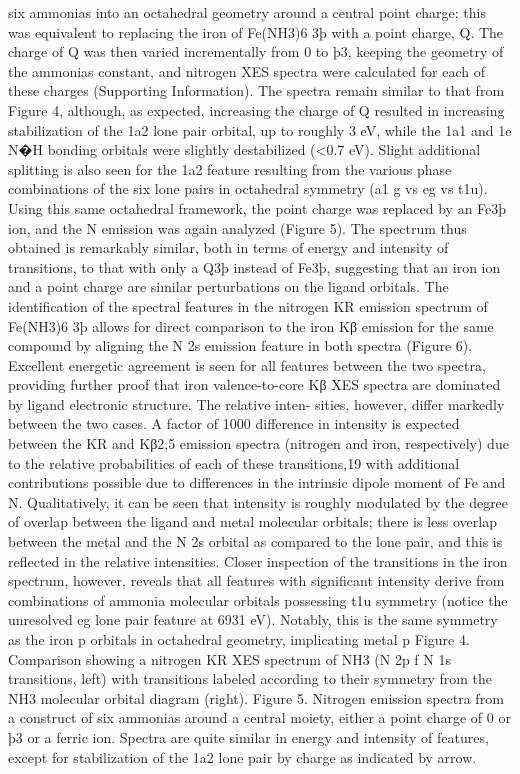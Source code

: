 six ammonias into an octahedral geometry around a central point
charge; this was equivalent to replacing the iron of Fe(NH3)6
3þ
with a point charge, Q. The charge of Q was then varied
incrementally from 0 to þ3, keeping the geometry of the ammonias
constant, and nitrogen XES spectra were calculated for each of these
charges (Supporting Information). The spectra remain similar to
that from Figure 4, although, as expected, increasing the charge of Q
resulted in increasing stabilization of the 1a2 lone pair orbital, up to
roughly 3 eV, while the 1a1 and 1e N�H bonding orbitals were
slightly destabilized (<0.7 eV). Slight additional splitting is also seen
for the 1a2 feature resulting from the various phase combinations
of the six lone pairs in octahedral symmetry (a1 g vs eg vs t1u).
Using this same octahedral framework, the point charge was
replaced by an Fe3þ ion, and the N emission was again analyzed
(Figure 5). The spectrum thus obtained is remarkably similar,
both in terms of energy and intensity of transitions, to that with
only a Q3þ instead of Fe3þ, suggesting that an iron ion and a
point charge are similar perturbations on the ligand orbitals.
The identiﬁcation of the spectral features in the nitrogen KR
emission spectrum of Fe(NH3)6
3þ allows for direct comparison to
the iron Kβ emission for the same compound by aligning the N 2s
emission feature in both spectra (Figure 6). Excellent energetic
agreement is seen for all features between the two spectra,
providing further proof that iron valence-to-core Kβ XES spectra
are dominated by ligand electronic structure. The relative inten-
sities, however, diﬀer markedly between the two cases. A factor of
1000 diﬀerence in intensity is expected between the KR and Kβ2,5
emission spectra (nitrogen and iron, respectively) due to the
relative probabilities of each of these transitions,19 with additional
contributions possible due to diﬀerences in the intrinsic dipole
moment of Fe and N.
Qualitatively, it can be seen that intensity is roughly modulated
by the degree of overlap between the ligand and metal molecular
orbitals; there is less overlap between the metal and the N 2s
orbital as compared to the lone pair, and this is reﬂected in the
relative intensities. Closer inspection of the transitions in the iron
spectrum, however, reveals that all features with signiﬁcant
intensity derive from combinations of ammonia molecular
orbitals possessing t1u symmetry (notice the unresolved eg lone
pair feature at 6931 eV). Notably, this is the same symmetry as
the iron p orbitals in octahedral geometry, implicating metal p
Figure 4. Comparison showing a nitrogen KR XES spectrum of NH3
(N 2p f N 1s transitions, left) with transitions labeled according to their
symmetry from the NH3 molecular orbital diagram (right).
Figure 5. Nitrogen emission spectra from a construct of six ammonias
around a central moiety, either a point charge of 0 or þ3 or a ferric ion.
Spectra are quite similar in energy and intensity of features, except for
stabilization of the 1a2 lone pair by charge as indicated by arrow.


